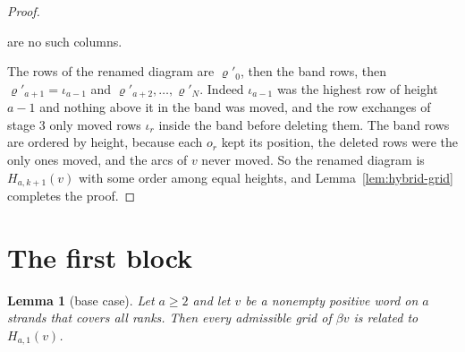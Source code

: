\documentclass[11pt]{amsart}
\newtheorem{lemma}[theorem]{Lemma}
\theoremstyle{definition}
\theoremstyle{remark}
\begin{document}
\begin{proof}
\begin{itemize}
are no such columns.
\end{itemize}
The rows of the renamed diagram are $\varrho'_0$, then the band rows, then $\varrho'_{a+1}=\iota_{a-1}$
and $\varrho'_{a+2},\dots,\varrho'_{N}$. Indeed $\iota_{a-1}$ was the highest row of height $a-1$ and
nothing above it in the band was moved, and the row exchanges of stage 3 only moved rows $\iota_r$
inside the band before deleting them. The band rows are ordered by height, because each $o_r$ kept
its position, the deleted rows were the only ones moved, and the arcs of $v$ never moved. So the
renamed diagram is $H_{a,k+1}(v)$ with some order among equal heights, and
Lemma~\ref{lem:hybrid-grid} completes the proof.
\end{proof}

\section{The first block}\label{sec:base}

\begin{lemma}[base case]\label{lem:base}
Let $a\ge2$ and let $v$ be a nonempty positive word on $a$ strands that covers all ranks. Then every
admissible grid of $\beta v$ is related to $H_{a,1}(v)$.
\end{lemma}
\end{document}

